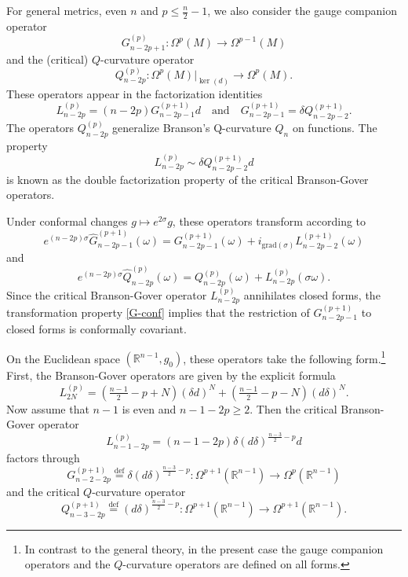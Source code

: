 \documentclass[a4paper,12pt,reqno]{amsart}
\numberwithin{theorem}{subsection}
\numberwithin{equation}{section}
\begin{document}
For general metrics, even $n$ and $p \le \tfrac{n}{2}-1$, we also consider the
gauge companion operator
$$
   G_{n-2p+1}^{(p)}: \Omega^p(M) \to \Omega^{p-1}(M)
$$
and the (critical) $Q$-curvature operator
$$
   Q_{n-2p}^{(p)}: \Omega^p(M)|_{\ker ({d})} \to \Omega^p(M).
$$
These operators appear in the factorization identities
$$
   L_{n-2p}^{(p)} = (n\!-\!2p) G_{n-2p-1}^{(p+1)} {d} \quad \mbox{and} \quad G_{n-2p-1}^{(p+1)} = \delta
   Q^{(p+1)}_{n-2p-2}.
$$
The operators $Q_{n-2p}^{(p)}$ generalize Branson's Q-curvature $Q_n$ on
functions. The property
\begin{equation}\label{double}
   L_{n-2p}^{(p)} \sim \delta Q^{(p+1)}_{n-2p-2} {d}
\end{equation}
is known as the double factorization property of the critical Branson-Gover
operators.

Under conformal changes $g \mapsto e^{2\sigma} g$, these operators transform
according to
\begin{equation}\label{G-conf}
  e^{(n-2p) \sigma} \widehat{G}_{n-2p-1}^{(p+1)}(\omega) =
  G_{n-2p-1}^{(p+1)}(\omega) + i_{{\text{grad}}(\sigma)} L^{(p+1)}_{n-2p-2}(\omega)
\end{equation}
and
\begin{equation}\label{Q-conf}
  e^{(n-2p)\sigma} \widehat{Q}_{n-2p}^{(p)}(\omega) =
  Q_{n-2p}^{(p)}(\omega) + L^{(p)}_{n-2p}(\sigma \omega).
\end{equation}
Since the critical Branson-Gover operator $L_{n-2p}^{(p)}$ annihilates closed
forms, the transformation property \eqref{G-conf} implies that the restriction
of $G_{n-2p-1}^{(p+1)}$ to closed forms is conformally covariant.

On the Euclidean space $({\mathbb{R}}^{n-1},g_0)$, these operators take the following
form.\footnote{In contrast to the general theory, in the present case the gauge
companion operators and the $Q$-curvature operators are defined on all forms.}
First, the Branson-Gover operators are given by the explicit formula
\begin{equation}\label{BG-flat}
   L_{2N}^{(p)} = (\tfrac{n-1}{2}\!-\!p\!+\!N) (\delta {d})^N + (\tfrac{n-1}{2}\!-\!p\!-\!N) ({d}\delta)^N.
\end{equation}
Now assume that $n-1$ is even and $n\!-\!1\!-\!2p \ge 2$. Then the critical
Branson-Gover operator
\begin{equation*}
   L^{(p)}_{n-1-2p} = (n\!-\!1\!-\!2p) \delta({d}\delta)^{\frac{n-3}{2}-p}{d}
\end{equation*}
factors through
\begin{equation*}
   G^{(p+1)}_{n-2-2p} {\stackrel{\text{def}}{=}} \delta({d}\delta)^{\frac{n-3}{2}-p}: \Omega^{p+1}({\mathbb{R}}^{n-1}) \to \Omega^p({\mathbb{R}}^{n-1})
\end{equation*}
and the critical $Q$-curvature operator
\begin{equation*}
   Q_{n-3-2p}^{(p+1)} {\stackrel{\text{def}}{=}} ({d}\delta)^{\frac{n-3}{2}-p}: \Omega^{p+1}({\mathbb{R}}^{n-1})\to\Omega^{p+1}({\mathbb{R}}^{n-1}).
\end{equation*}
\end{document}

